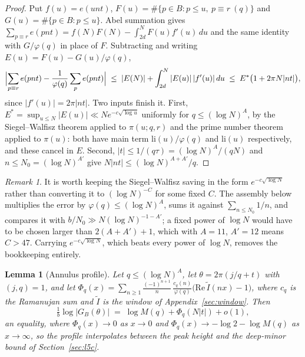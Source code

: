 \documentclass[11pt,a4paper]{article}
\theoremstyle{plain}
\newtheorem{lemma}[theorem]{Lemma}
\theoremstyle{definition}
\theoremstyle{remark}
\newtheorem{remark}[theorem]{Remark}
\begin{document}
\begin{proof}
Put $f(u)=e(unt)$, $F(u)=\#\{p\in B:p\le u,\ p\equiv r\ (q)\}$ and
$G(u)=\#\{p\in B:p\le u\}$. Abel summation gives
$\sum_{p\equiv r}e(pnt)=f(N)F(N)-\int_{2d}^{N}F(u)f'(u)\,du$ and the same
identity with $G/\varphi(q)$ in place of $F$. Subtracting and writing
$E(u)=F(u)-G(u)/\varphi(q)$,
\[
  \Bigl|\sum_{p\equiv r}e(pnt)-\frac{1}{\varphi(q)}\sum_{p}e(pnt)\Bigr|
  \;\le\;|E(N)|+\int_{2d}^{N}|E(u)|\,|f'(u)|\,du
  \;\le\;E^{*}\bigl(1+2\pi N|nt|\bigr),
\]
since $|f'(u)|=2\pi|nt|$. Two inputs finish it. First, $E^{*}=\sup_{u\le
N}|E(u)|\ll Ne^{-c\sqrt{\log u}}$ uniformly for $q\le(\log N)^{A}$, by the
Siegel--Walfisz theorem applied to $\pi(u;q,r)$ and the prime number theorem
applied to $\pi(u)$: both have main term $\mathrm{li}(u)/\varphi(q)$ and
$\mathrm{li}(u)$ respectively, and these cancel in $E$. Second,
$|t|\le1/(q\tau)=(\log N)^{A}/(qN)$ and $n\le N_0=(\log N)^{A'}$ give
$N|nt|\le(\log N)^{A+A'}/q$.
\end{proof}

\begin{remark}
It is worth keeping the Siegel--Walfisz saving in the form
$e^{-c\sqrt{\log N}}$ rather than converting it to $(\log N)^{-C}$ for some
fixed $C$. The assembly below multiplies the error by $\varphi(q)\le(\log
N)^{A}$, sums it against $\sum_{n\le N_0}1/n$, and compares it with
$b/N_0\gg N(\log N)^{-1-A'}$; a fixed power of $\log N$ would have to be chosen
larger than $2(A+A')+1$, which with $A=11$, $A'=12$ means $C>47$. Carrying
$e^{-c\sqrt{\log N}}$, which beats every power of $\log N$, removes the
bookkeeping entirely.
\end{remark}

\begin{lemma}[Annulus profile]\label{lem:annulus}
Let $q\le(\log N)^{A}$, let $\theta=2\pi(j/q+t)$ with $(j,q)=1$, and let
$\Phi_q(x)=\sum_{n\ge1}\frac{(-1)^{n+1}}{n}\,\frac{c_q(n)}{\varphi(q)}
\bigl(\mathrm{Re}\,\widetilde I(nx)-1\bigr)$, where $c_q$ is the Ramanujan sum and
$\widetilde I$ is the window of Appendix~\ref{sec:window}. Then
\[
  \tfrac1b\log|G_B(\theta)|\;=\;\log M(q)+\Phi_q(N|t|)+o(1),
\]
an \emph{equality}, where $\Phi_q(x)\to0$ as $x\to0$ and
$\Phi_q(x)\to-\log2-\log M(q)$ as $x\to\infty$, so the profile interpolates
between the peak height and the deep-minor bound of Section~\ref{sec:l5c}.
\end{lemma}
\end{document}
